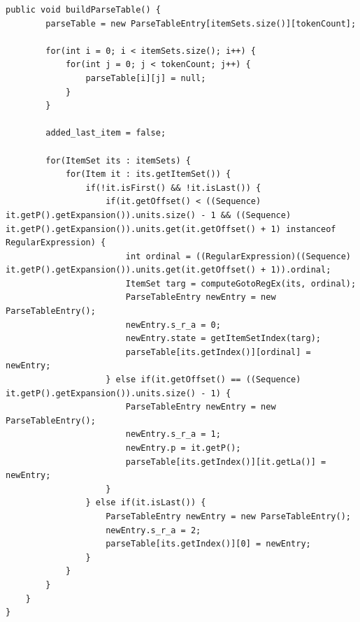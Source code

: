 \documentclass[•]{book}
\begin{document}
\begin{lstlisting}
public void buildParseTable() {
		parseTable = new ParseTableEntry[itemSets.size()][tokenCount];
		
		for(int i = 0; i < itemSets.size(); i++) {
			for(int j = 0; j < tokenCount; j++) {
				parseTable[i][j] = null;
			}
		}
		
		added_last_item = false;
		
		for(ItemSet its : itemSets) {
			for(Item it : its.getItemSet()) {
				if(!it.isFirst() && !it.isLast()) {
					if(it.getOffset() < ((Sequence) it.getP().getExpansion()).units.size() - 1 && ((Sequence) it.getP().getExpansion()).units.get(it.getOffset() + 1) instanceof RegularExpression) {
						int ordinal = ((RegularExpression)((Sequence) it.getP().getExpansion()).units.get(it.getOffset() + 1)).ordinal;
						ItemSet targ = computeGotoRegEx(its, ordinal);
						ParseTableEntry newEntry = new ParseTableEntry();
						newEntry.s_r_a = 0;
						newEntry.state = getItemSetIndex(targ);
						parseTable[its.getIndex()][ordinal] = newEntry;	
					} else if(it.getOffset() == ((Sequence) it.getP().getExpansion()).units.size() - 1) {
						ParseTableEntry newEntry = new ParseTableEntry();
						newEntry.s_r_a = 1;
						newEntry.p = it.getP();
						parseTable[its.getIndex()][it.getLa()] = newEntry;
					}
				} else if(it.isLast()) {
					ParseTableEntry newEntry = new ParseTableEntry();
					newEntry.s_r_a = 2;
					parseTable[its.getIndex()][0] = newEntry;
				}
			}
		}
	}	
}
\end{lstlisting}
\end{document}
